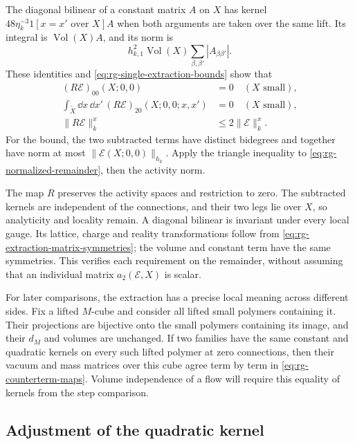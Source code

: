 The diagonal bilinear of a constant matrix $A$ on $X$ has
kernel $48\eta_k^{-3}1[x=x'\text{ over }X]A$ when both
arguments are taken over the same lift. Its integral is
$\operatorname{Vol}(X)A$, and its norm is
\[
 h_{k,1}^2\operatorname{Vol}(X)
                         \sum_{\beta,\beta'}|A_{\beta\beta'}|.
\]
These identities and \eqref{eq:rg-single-extraction-bounds}
show that
\begin{equation}\label{eq:rg-remainder-properties}
 \begin{split}
 (R\mathscr E)_{00}(X;0,0)&=0\quad(X\text{ small}),\\
 \int_{\widetilde X}\dd x\,\dd x'\,
                  (R\mathscr E)_{20}(X;0,0;x,x')&=0\quad(X\text{ small}),\\
 \|R\mathscr E\|_k^x&\le2\|\mathscr E\|_k^x.
 \end{split}
\end{equation}
For the bound, the two subtracted terms have distinct bidegrees
and together have norm at most $\|\mathscr E(X;0,0)\|_{h_k}$.
Apply the triangle inequality to
\eqref{eq:rg-normalized-remainder}, then the activity norm.

The map $R$ preserves the activity spaces and restriction to
zero. The subtracted kernels are independent of the connections,
and their two legs lie over $X$, so analyticity and locality
remain. A diagonal bilinear is invariant under every local
gauge. Its lattice, charge and reality transformations follow
from \eqref{eq:rg-extraction-matrix-symmetries}; the volume
and constant term have the same symmetries. This verifies
each requirement on the remainder, without assuming that
an individual matrix $a_2(\mathscr E,X)$ is scalar.

For later comparisons, the extraction has a precise local
meaning across different sides. Fix a lifted $M$-cube and
consider all lifted small polymers containing it. Their
projections are bijective onto the small polymers containing
its image, and their $d_M$ and volumes are unchanged.
If two families have the same constant and quadratic kernels
on every such lifted polymer at zero connections, then their
vacuum and mass matrices over this cube agree term by term in
\eqref{eq:rg-counterterm-maps}. Volume independence of a flow
will require this equality of kernels from the step comparison.
\subsection{Adjustment of the quadratic kernel}
\label{subsec:rg-adjustment}

